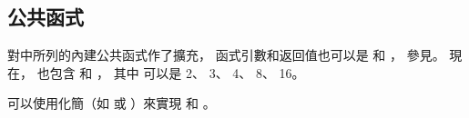 \subsection{公共函式}

對中所列的內建公共函式作了擴充，
函式引數和返回值也可以是  和 ，
參見。
現在，  也包含  和 ，
其中  可以是 2、 3、 4、 8、 16。

\startnotepar
可以使用化簡（如  或 ）來實現  和 。
\stopnotepar

{}
